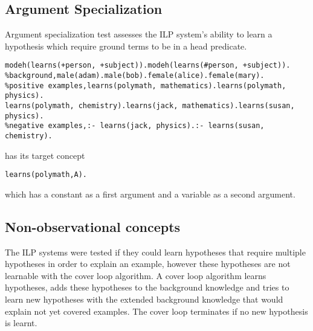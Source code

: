 \subsection{Argument Specialization}
Argument specialization test assesses the ILP system's ability to learn a hypothesis which require ground terms to be in a head predicate.
\begin{lstlisting}
modeh(learns(+person, +subject)).modeh(learns(#person, +subject)).
%background,male(adam).male(bob).female(alice).female(mary).
%positive examples,learns(polymath, mathematics).learns(polymath, physics).
learns(polymath, chemistry).learns(jack, mathematics).learns(susan, physics).
%negative examples,:- learns(jack, physics).:- learns(susan, chemistry).
\end{lstlisting}
has its target concept
\begin{lstlisting}
learns(polymath,A).
\end{lstlisting}
which has a constant  as a first argument and a variable as a second argument.

\subsection{Non-observational concepts}
The ILP systems were tested if they could learn hypotheses that require multiple hypotheses in order to explain an example, however these hypotheses are not learnable with the cover loop algorithm. A cover loop algorithm learns hypotheses, adds these hypotheses to the background knowledge and tries to learn new hypotheses with the extended background knowledge that would explain not yet covered examples. The cover loop terminates if no new hypothesis is learnt.

